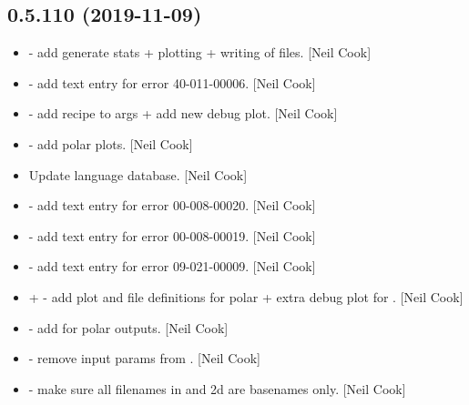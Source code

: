 \documentclass[a4paper,10pt,english]{report}
\begin{document}
\subsection{0.5.110 (2019-11-09)}
\label{\detokenize{misc/changelog:id33}}\begin{itemize}
\item {} 
 - add generate stats + plotting + writing of files.
{[}Neil Cook{]}

\item {} 
 - add text entry for error 40-011-00006. {[}Neil
Cook{]}

\item {} 
 - add recipe to args + add new debug
plot. {[}Neil Cook{]}

\item {} 
 - add polar plots. {[}Neil Cook{]}

\item {} 
Update language database. {[}Neil Cook{]}

\item {} 
 - add text entry for error 00-008-00020. {[}Neil Cook{]}

\item {} 
 - add text entry for error 00-008-00019. {[}Neil Cook{]}

\item {} 
 - add text entry for error 09-021-00009. {[}Neil Cook{]}

\item {} 
 +  -
add plot and file definitions for polar + extra debug plot for
. {[}Neil Cook{]}

\item {} 
 - add  for polar outputs.
{[}Neil Cook{]}

\item {} 
 - remove input params from
. {[}Neil Cook{]}

\item {} 
 - make sure all filenames in  and 2d
are basenames only. {[}Neil Cook{]}


\end{itemize}
\end{document}
